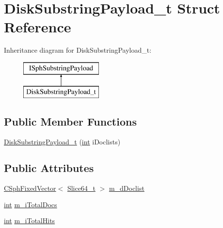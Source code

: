 \hypertarget{structDiskSubstringPayload__t}{\section{Disk\-Substring\-Payload\-\_\-t Struct Reference}
\label{structDiskSubstringPayload__t}
}
Inheritance diagram for Disk\-Substring\-Payload\-\_\-t\-:\begin{figure}[H]
\begin{center}
\leavevmode
\includegraphics[height=2.000000cm]{structDiskSubstringPayload__t}
\end{center}
\end{figure}
\subsection*{Public Member Functions}
\begin{DoxyCompactItemize}
\item 
\hyperlink{structDiskSubstringPayload__t_a1b2bf7457fc5038da3c3f3a3974548ef}{Disk\-Substring\-Payload\-\_\-t} (\hyperlink{sphinxexpr_8cpp_a4a26e8f9cb8b736e0c4cbf4d16de985e}{int} i\-Doclists)
\end{DoxyCompactItemize}
\subsection*{Public Attributes}
\begin{DoxyCompactItemize}
\item 
\hyperlink{classCSphFixedVector}{C\-Sph\-Fixed\-Vector}$<$ \hyperlink{structSlice64__t}{Slice64\-\_\-t} $>$ \hyperlink{structDiskSubstringPayload__t_ade8971ccb624c135456aa6b28f0b7abc}{m\-\_\-d\-Doclist}
\item 
\hyperlink{sphinxexpr_8cpp_a4a26e8f9cb8b736e0c4cbf4d16de985e}{int} \hyperlink{structDiskSubstringPayload__t_acdfbb4785f5ff30015ec1a79710c37df}{m\-\_\-i\-Total\-Docs}
\item 
\hyperlink{sphinxexpr_8cpp_a4a26e8f9cb8b736e0c4cbf4d16de985e}{int} \hyperlink{structDiskSubstringPayload__t_a33a5de4908cb1bd41a80ae0c69eed694}{m\-\_\-i\-Total\-Hits}
\end{DoxyCompactItemize}


